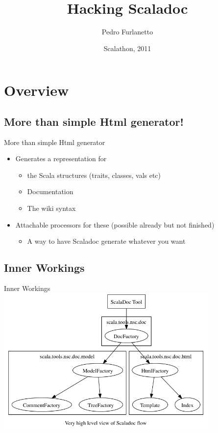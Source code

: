 \documentclass{beamer}
\title{Hacking Scaladoc}
\author{Pedro Furlanetto}
\institute
{
\begin{minipage}{0.6\textwidth}
\begin{flushleft} 
\end{flushleft}
\end{minipage}
\begin{minipage}{0.3\textwidth}
\end{minipage}
  
}
\date[Scalathon 2011] %
{Scalathon, 2011}
\begin{document}


\section{Overview}

\subsection{More than simple Html generator!}

\begin{frame}{More than simple Html generator}
	\begin{itemize} %
	\item Generates a representation for
		\begin{itemize}  
		\item the Scala structures (traits, classes, vals etc)
		\item Documentation
		\item The wiki syntax
		\end{itemize}
	\item Attachable processors for these (possible already but not finished)
		\begin{itemize}  
		\item A way to have Scaladoc generate whatever you want
		\end{itemize}
	\end{itemize}
\end{frame}


\subsection{Inner Workings}
\begin{frame}{Inner Workings} 
	\includegraphics[width=11cm]{../docs/flow.png} 
\end{frame}
\end{document}
